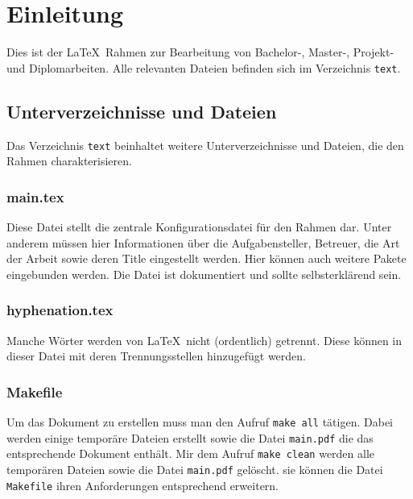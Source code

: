 %
%
\chapter{Einleitung}\label{sec:Introduction}
Dies ist der \LaTeX\ Rahmen zur Bearbeitung von Bachelor-, Master-, Projekt- und Diplomarbeiten.
Alle relevanten Dateien befinden sich im Verzeichnis \verb|text|.
\section{Unterverzeichnisse und Dateien}
Das Verzeichnis \verb|text| beinhaltet weitere Unterverzeichnisse und Dateien, die den Rahmen charakterisieren.
\subsection{\textbf{main.tex}}\label{subsec:main}
Diese Datei stellt die zentrale Konfigurationsdatei für den Rahmen dar. Unter anderem müssen hier Informationen
über die Aufgabensteller, Betreuer, die Art der Arbeit sowie deren Title eingestellt werden.
Hier können auch weitere Pakete eingebunden werden. Die Datei ist dokumentiert und sollte selbsterklärend
sein.
\subsection{\textbf{hyphenation.tex}}
Manche Wörter werden von \LaTeX\ nicht (ordentlich) getrennt. Diese können in dieser Datei mit deren
Trennungsstellen hinzugefügt werden.
\subsection{\textbf{Makefile}}
Um das Dokument zu erstellen muss man den Aufruf \verb|make all| tätigen. Dabei werden einige temporäre
Dateien erstellt sowie die Datei \verb|main.pdf| die das entsprechende Dokument enthält. Mir dem
Aufruf \verb|make clean| werden alle temporären Dateien sowie die Datei \verb|main.pdf| gelöscht.
sie können die Datei \verb|Makefile| ihren Anforderungen entsprechend erweitern.
